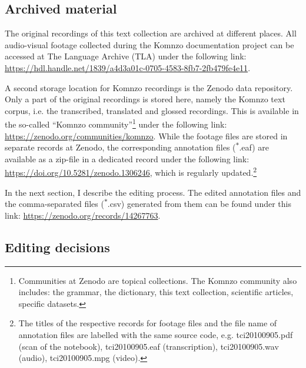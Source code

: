 \subsection{Archived material}

The original recordings of this text collection are archived at different places. All audio-visual footage collected during the Komnzo documentation project can be accessed at The Language Archive (TLA) under the following link: \url{https://hdl.handle.net/1839/a4d3a01c-0705-4583-8fb7-2fb479fe4e11}.

A second storage location for Komnzo recordings is the Zenodo data repository. Only a part of the original recordings is stored here, namely the Komnzo text corpus, i.e. the transcribed, translated and glossed recordings. This is available in the so-called ``Komnzo community''\footnote{Communities at Zenodo are topical collections. The Komnzo community also includes: the grammar, the dictionary, this text collection, scientific articles, specific datasets.} under the following link: \url{https://zenodo.org/communities/komnzo}. While the footage files are stored in separate records at Zenodo, the corresponding annotation files (\textsuperscript{$\ast$}.eaf) are available as a zip-file in a dedicated record under the following link: \url{https://doi.org/10.5281/zenodo.1306246}, which is regularly updated.\footnote{The titles of the respective records for footage files and the file name of annotation files are labelled with the same source code, e.g.  tci20100905.pdf (scan of the notebook), tci20100905.eaf (transcription), tci20100905.wav (audio), tci20100905.mpg (video).} 

In the next section, I describe the editing process. The edited annotation files and the comma-separated files (\textsuperscript{$\ast$}.csv) generated from them can be found under this link: \url{https://zenodo.org/records/14267763}.

\subsection{Editing decisions}\label{subsec:editing}

